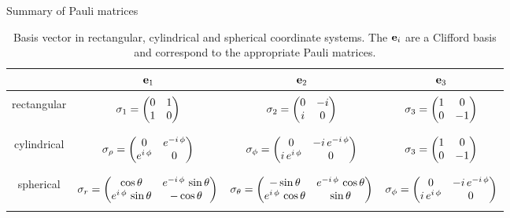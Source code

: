 \documentclass[handout,10pt]{beamer}
\begin{document}
\begin{frame}[shrink=30]{Summary of Pauli matrices}
\begin{table}[]
\centering
\caption{Basis vector in rectangular, cylindrical and spherical coordinate systems. 
%
The $\mathbf{e}_i$ are a Clifford basis and correspond to the appropriate Pauli matrices.}
\label{sigmai_table2}
\begin{tabular}{| c | c | c | c | }
\hline
 & $\mathbf{e}_1$ & $\mathbf{e}_2$  & $\mathbf{e}_3$  \\
\hline
 & & & \\
rectangular 
& $\sigma_1 = \begin{pmatrix}0 & 1\cr 1 & 0\end{pmatrix}$ 
& $\sigma_2 = \begin{pmatrix}0 & -i\cr i & 0\end{pmatrix}$  
& $\sigma_3 = \begin{pmatrix}1 & 0\cr 0 & -1\end{pmatrix} $ \\ 
 & & & \\
 \hline
 & & & \\
cylindrical 
&  $\sigma_\rho =  \begin{pmatrix}0 & {e}^{-i\,\phi}\cr {e}^{i\,\phi} & 0\end{pmatrix}$ 
&  $\sigma_\phi = \begin{pmatrix}0 & -i\,{e}^{-i\,\phi}\cr i\,{e}^{i\,\phi} & 0\end{pmatrix} $  
&  $\sigma_3 = \begin{pmatrix}1 & 0\cr 0 & -1\end{pmatrix}$    \\
 & & & \\
 \hline
 & & & \\
spherical 
&  $\sigma_r =  \begin{pmatrix}\cos \theta  & {e}^{-i\,\phi}\, \sin \theta \cr {e}^{i\,\phi}  \, \sin \theta & -\cos \theta \end{pmatrix}$ 
&  $\sigma_\theta = \begin{pmatrix}-\sin\theta & {e}^{-i\,\phi}\, \cos \theta \cr {e}^{i\,\phi}  \, \cos \theta& \sin \theta \end{pmatrix}$  
&  $\sigma_\phi  =  \begin{pmatrix}0 & -i\,{e}^{-i\,\phi}\cr i\,{e}^{i\,\phi} & 0\end{pmatrix}$  \\ 
 & & & \\
 \hline
 \end{tabular}
\end{table}
\end{frame}
\end{document}
